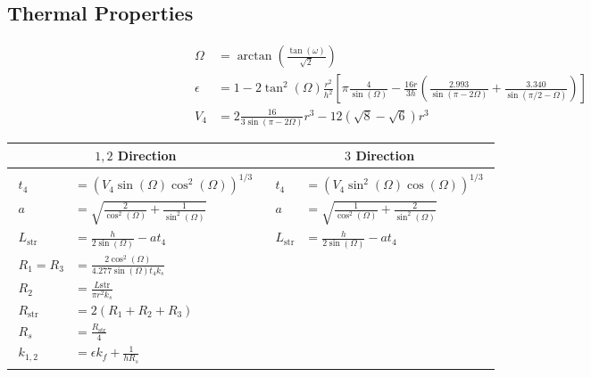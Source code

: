 \subsection*{Thermal Properties}
\begin{equation*}
    \begin{split}
        \Omega &= \arctan\left(\frac{\tan(\omega)}{\sqrt{2}}\right) \\
        \epsilon &= 1 - 2\tan^2(\Omega)\frac{r^2}{h^2}\left[ \pi\frac{4}{\sin(\Omega)}-\frac{16r}{3h}\left(\frac{2.993}{\sin(\pi-2\Omega)}+\frac{3.340}{\sin(\pi/2-\Omega)}\right) \right] \\
        V_4 &= 2\frac{16}{3\sin(\pi-2\Omega)}r^3-12\left(\sqrt{8}-\sqrt{6}\right)r^3
    \end{split}
\end{equation*}
\begin{table}[ht]
    \centering
    \begin{tabular}{c | c}
        $1,2$ Direction & $3$ Direction \\ \hline
        \parbox{0.49\linewidth}{
        \begin{equation*}
            \begin{split}
                t_4 &= \left(V_4\sin(\Omega)\cos^2(\Omega)\right)^{1/3} \\
                a &= \sqrt{\frac{2}{\cos^2(\Omega)}+\frac{1}{\sin^2(\Omega)}} \\
                L_\text{str} &= \frac{h}{2\sin(\Omega)}-at_4 \\
                R_1 = R_3 &= \frac{2\cos^2(\Omega)}{4.277\sin(\Omega)t_4k_s} \\
                R_2 &= \frac{L\text{str}}{\pi r^2k_s} \\
                R_\text{str} &= 2(R_1 + R_2 + R_3) \\
                R_s &= \frac{R_\text{str}}{4} \\
                k_{1,2} &= \epsilon k_f + \frac{1}{hR_s}
            \end{split}
        \end{equation*} 
        }
        & 
        \parbox{0.49\linewidth}{
        \begin{equation*}
            \begin{split}
                t_4 &= \left(V_4\sin^2(\Omega)\cos(\Omega)\right)^{1/3} \\
                a &= \sqrt{\frac{1}{\cos^2(\Omega)}+\frac{2}{\sin^2(\Omega)}} \\
                L_\text{str} &= \frac{h}{2\sin(\Omega)}-at_4 \\

\end{split}
\end{equation*}}
\end{tabular}
\end{table}

